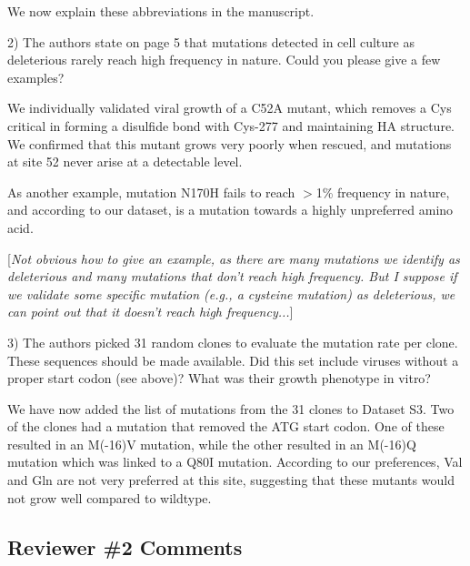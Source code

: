 \documentclass[11pt, oneside]{article}   	%
\newcommand{\comment}[1]{{\color{red}[\textsl{#1}]}}
\newcommand{\response}[1]{{\color{black}#1}}
\begin{document}
\response{We now explain these abbreviations in the manuscript.}

2) The authors state on page 5 that mutations detected in cell culture as deleterious rarely reach high frequency in nature. Could you please give a few examples? 

\response{We individually validated viral growth of a C52A mutant, which removes a Cys critical in forming a disulfide bond with Cys-277 and maintaining HA structure.
We confirmed that this mutant grows very poorly when rescued, and mutations at site 52 never arise at a detectable level.

As another example, mutation N170H fails to reach $>$1\% frequency in nature, and according to our dataset, is a mutation towards a highly unpreferred amino acid. 
}

\comment{Not obvious how to give an example, as there are many mutations we identify as deleterious and many mutations that don't reach high frequency. 
But I suppose if we validate some specific mutation (e.g., a cysteine mutation) as deleterious, we can point out that it doesn't reach high frequency...}

3) The authors picked 31 random clones to evaluate the mutation rate per clone. These sequences should be made available. Did this set include viruses without a proper start codon (see above)? What was their growth phenotype in vitro? 

\response{We have now added the list of mutations from the 31 clones to Dataset S3.
Two of the clones had a mutation that removed the ATG start codon.
One of these resulted in an M(-16)V mutation, while the other resulted in an M(-16)Q mutation which was linked to a Q80I mutation.
According to our preferences, Val and Gln are not very preferred at this site, suggesting that these mutants would not grow well compared to wildtype.
}

\subsection*{Reviewer \#2 Comments} 
\end{document}
